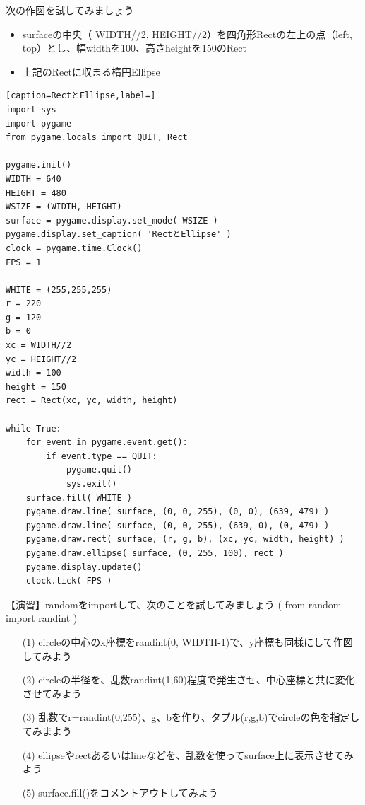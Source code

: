 \documentclass[uplatex,a4paper,11pt,oneside,openany]{jsbook}
\begin{document}

次の作図を試してみましょう
\begin{itemize}
\item surfaceの中央（ WIDTH//2, HEIGHT//2）を四角形Rectの左上の点（left, top）とし、幅widthを100、高さheightを150のRect
\item 上記のRectに収まる楕円Ellipse
\end{itemize}

\begin{lstlisting}[caption=RectとEllipse,label=]
import sys
import pygame
from pygame.locals import QUIT, Rect

pygame.init()
WIDTH = 640
HEIGHT = 480
WSIZE = (WIDTH, HEIGHT)
surface = pygame.display.set_mode( WSIZE )
pygame.display.set_caption( 'RectとEllipse' )
clock = pygame.time.Clock()
FPS = 1

WHITE = (255,255,255)
r = 220
g = 120
b = 0
xc = WIDTH//2
yc = HEIGHT//2
width = 100
height = 150
rect = Rect(xc, yc, width, height)

while True:
    for event in pygame.event.get():
        if event.type == QUIT:
            pygame.quit()
            sys.exit()
    surface.fill( WHITE )
    pygame.draw.line( surface, (0, 0, 255), (0, 0), (639, 479) )
    pygame.draw.line( surface, (0, 0, 255), (639, 0), (0, 479) )
    pygame.draw.rect( surface, (r, g, b), (xc, yc, width, height) )
    pygame.draw.ellipse( surface, (0, 255, 100), rect )
    pygame.display.update()
    clock.tick( FPS )
\end{lstlisting}

【演習】randomをimportして、次のことを試してみましょう
( from random import randint )
\begin{enumerate}
\item[(1)] circleの中心のx座標をrandint(0, WIDTH-1)で、y座標も同様にして作図してみよう
\item[(2)] circleの半径を、乱数randint(1,60)程度で発生させ、中心座標と共に変化させてみよう
\item[(3)] 乱数でr=randint(0,255)、g、bを作り、タプル(r,g,b)でcircleの色を指定してみまよう
\item[(4)] ellipseやrectあるいはlineなどを、乱数を使ってsurface上に表示させてみよう
\item[(5)] surface.fill()をコメントアウトしてみよう
\end{enumerate}%
\end{document}
